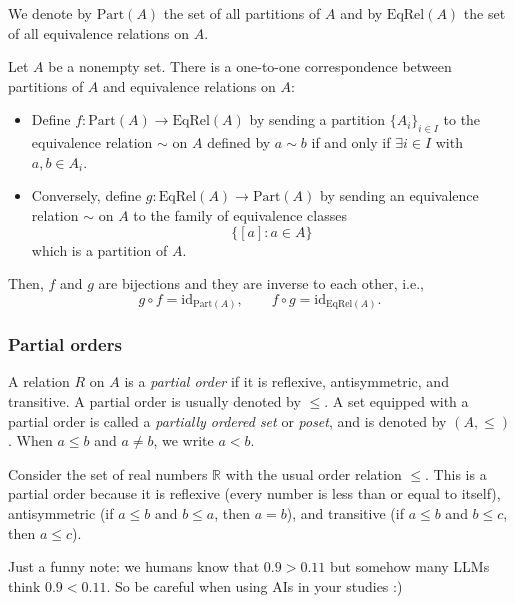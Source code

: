 We denote by $\mathrm{Part}(A)$ the set of all partitions of $A$ and by $\mathrm{EqRel}(A)$ the set of all equivalence relations on $A$.

  \begin{theorem}
  Let $A$ be a nonempty set. There is a one-to-one correspondence between partitions of $A$ and equivalence relations on $A$:
  \begin{itemize}
    \item Define $f:\mathrm{Part}(A)\to\mathrm{EqRel}(A)$ by sending a partition $\{A_i\}_{i\in I}$ to the equivalence relation $\sim$ on $A$ defined by $a\sim b$ if and only if $\exists i\in I$ with $a,b\in A_i$.
    \item Conversely, define $g:\mathrm{EqRel}(A)\to\mathrm{Part}(A)$ by sending an equivalence relation $\sim$ on $A$ to the family of equivalence classes
    \[
      \{[a]:a\in A\}
    \]
    which is a partition of $A$.
  \end{itemize}
  Then, $f$ and $g$ are bijections and they are inverse to each other, i.e.,
  \[
    g\circ f = \mathrm{id}_{\mathrm{Part}(A)},\qquad f\circ g = \mathrm{id}_{\mathrm{EqRel}(A)}.
  \]
  \end{theorem}



\subsubsection{Partial orders}

\begin{definition}
  A relation $R$ on $A$ is a \emph{partial order} if it is reflexive, antisymmetric, and transitive. A partial order is usually denoted by \(\leq\). A set equipped with a partial order is called a \emph{partially ordered set} or \emph{poset}, and is denoted by \((A, \leq)\). When $a\leq b$ and $a\neq b$, we write $a<b$.
\end{definition}

\begin{example}
  Consider the set of real numbers \(\mathbb{R}\) with the usual order relation \(\leq\). This is a partial order because it is reflexive (every number is less than or equal to itself), antisymmetric (if \(a \leq b\) and \(b \leq a\), then \(a = b\)), and transitive (if \(a \leq b\) and \(b \leq c\), then \(a \leq c\)).

  Just a funny note: we humans know that $0.9>0.11$ but somehow many LLMs think $0.9<0.11$. So be careful when using AIs in your studies :)
\end{example}

